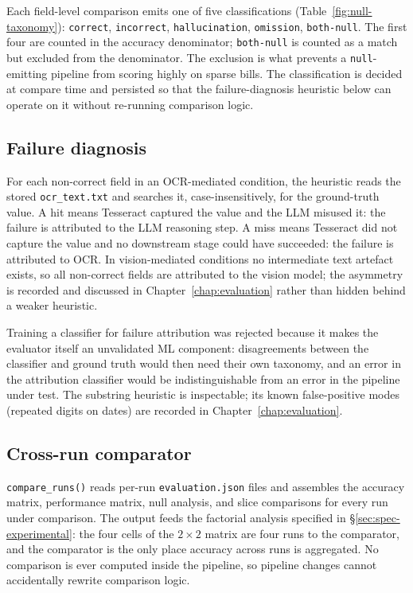 Each field-level comparison emits one of five classifications
(Table~\ref{fig:null-taxonomy}): \texttt{correct},
\texttt{incorrect}, \texttt{hallucination}, \texttt{omission},
\texttt{both-null}. The first four are counted in the accuracy
denominator; \texttt{both-null} is counted as a match but excluded
from the denominator. The exclusion is what prevents a
\texttt{null}-emitting pipeline from scoring highly on sparse
bills. The classification is decided at compare time and persisted
so that the failure-diagnosis heuristic below can operate on it
without re-running comparison logic.

\subsection{Failure diagnosis}
\label{sec:design-evalframework-diagnosis}

For each non-correct field in an OCR-mediated condition, the
heuristic reads the stored \texttt{ocr\_text.txt} and searches it,
case-insensitively, for the ground-truth value. A hit means
Tesseract captured the value and the LLM misused it: the failure
is attributed to the LLM reasoning step. A miss means Tesseract did
not capture the value and no downstream stage could have succeeded:
the failure is attributed to OCR. In vision-mediated conditions no
intermediate text artefact exists, so all non-correct fields are
attributed to the vision model; the asymmetry is recorded and
discussed in Chapter~\ref{chap:evaluation} rather than hidden behind
a weaker heuristic.

Training a classifier for failure attribution was rejected because
it makes the evaluator itself an unvalidated ML component:
disagreements between the classifier and ground truth would then
need their own taxonomy, and an error in the attribution classifier
would be indistinguishable from an error in the pipeline under
test. The substring heuristic is inspectable; its known
false-positive modes (repeated digits on dates) are recorded in
Chapter~\ref{chap:evaluation}.

\subsection{Cross-run comparator}

\texttt{compare\_runs()} reads per-run \texttt{evaluation.json}
files and assembles the accuracy matrix, performance matrix, null
analysis, and slice comparisons for every run under comparison.
The output feeds the factorial analysis specified in
\S\ref{sec:spec-experimental}: the four cells of the $2 \times 2$
matrix are four runs to the comparator, and the comparator is the
only place accuracy across runs is aggregated. No comparison is
ever computed inside the pipeline, so pipeline changes cannot
accidentally rewrite comparison logic.

